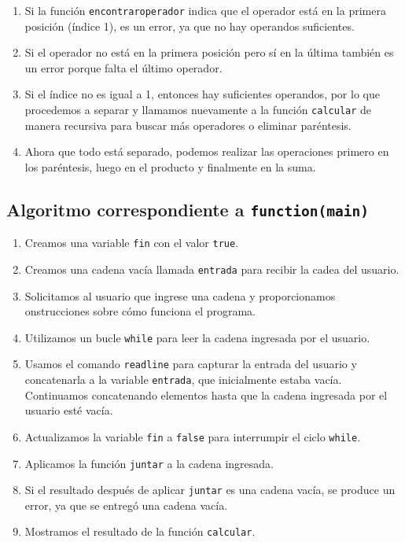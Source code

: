 \documentclass{article}
\begin{document}
\begin{enumerate}
    \item Si la función \texttt{encontrar\textunderscore operador} indica que el operador está en la primera posición (índice 1), es un error, ya que no hay operandos suficientes. 

    \item Si el operador no está en la primera posición pero sí en la última también es un error porque falta el último operador. 

    \item Si el índice no es igual a 1, entonces hay suficientes operandos, por lo que procedemos a separar y llamamos nuevamente a la función \texttt{calcular} de manera recursiva para buscar más operadores o eliminar paréntesis. 

    \item Ahora que todo está separado, podemos realizar las operaciones primero en los paréntesis, luego en el producto y finalmente en la suma.\\
\end{enumerate}

\subsection{Algoritmo correspondiente a \texttt{function(main)}}
\begin{enumerate}
    \item Creamos una variable \texttt{fin} con el valor \texttt{true}.

    \item Creamos una cadena vacía llamada \texttt{entrada} para recibir la cadea del usuario.

    \item Solicitamos al usuario que ingrese una cadena y proporcionamos onstrucciones sobre cómo funciona el programa.

    \item Utilizamos un bucle \texttt{while} para leer la cadena ingresada por el usuario.

    \item Usamos el comando \texttt{readline} para capturar la entrada del usuario y concatenarla a la variable \texttt{entrada}, que inicialmente estaba vacía. Continuamos concatenando elementos hasta que la cadena ingresada por el usuario esté vacía.

    \item Actualizamos la variable \texttt{fin} a \texttt{false} para interrumpir el ciclo \texttt{while}.

    \item Aplicamos la función \texttt{juntar} a la cadena ingresada. 

    \item Si el resultado después de aplicar \texttt{juntar} es una cadena vacía, se produce un error, ya que se entregó una cadena vacía.

    \item Mostramos el resultado de la función \texttt{calcular}.\\
\end{enumerate}
\end{document}
